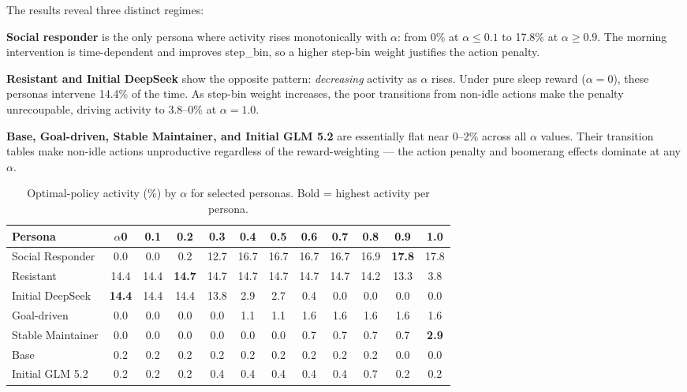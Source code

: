 \documentclass[11pt]{article}
\begin{document}
The results reveal three distinct regimes:

\textbf{Social responder} is the only persona where activity rises monotonically with $\alpha$: from 0\% at $\alpha \leq 0.1$ to 17.8\% at $\alpha \geq 0.9$. The morning intervention is time-dependent and improves step\_bin, so a higher step-bin weight justifies the action penalty.

\textbf{Resistant and Initial DeepSeek} show the opposite pattern: \emph{decreasing} activity as $\alpha$ rises. Under pure sleep reward ($\alpha = 0$), these personas intervene 14.4\% of the time. As step-bin weight increases, the poor transitions from non-idle actions make the penalty unrecoupable, driving activity to 3.8--0\% at $\alpha = 1.0$.

\textbf{Base, Goal-driven, Stable Maintainer, and Initial GLM 5.2} are essentially flat near 0--2\% across all $\alpha$ values. Their transition tables make non-idle actions unproductive regardless of the reward-weighting — the action penalty and boomerang effects dominate at any $\alpha$.

\begin{table}[H]
  \centering
  \caption{Optimal-policy activity (\%) by $\alpha$ for selected personas. Bold = highest activity per persona.}
  \label{tab:alpha_grid}
  \begin{tabular}{l|ccccccccccc}
    \toprule
    Persona & $\alpha$0 & 0.1 & 0.2 & 0.3 & 0.4 & 0.5 & 0.6 & 0.7 & 0.8 & \textbf{0.9} & 1.0 \\
    \midrule
    Social Responder  & 0.0 & 0.0 & 0.2 & 12.7 & 16.7 & 16.7 & 16.7 & 16.7 & 16.9 & \textbf{17.8} & 17.8 \\
    Resistant         & 14.4 & 14.4 & \textbf{14.7} & 14.7 & 14.7 & 14.7 & 14.7 & 14.7 & 14.2 & 13.3 & 3.8 \\
    Initial DeepSeek  & \textbf{14.4} & 14.4 & 14.4 & 13.8 & 2.9 & 2.7 & 0.4 & 0.0 & 0.0 & 0.0 & 0.0 \\
    Goal-driven       & 0.0 & 0.0 & 0.0 & 0.0 & 1.1 & 1.1 & 1.6 & 1.6 & 1.6 & 1.6 & 1.6 \\
    Stable Maintainer & 0.0 & 0.0 & 0.0 & 0.0 & 0.0 & 0.0 & 0.7 & 0.7 & 0.7 & 0.7 & \textbf{2.9} \\
    Base              & 0.2 & 0.2 & 0.2 & 0.2 & 0.2 & 0.2 & 0.2 & 0.2 & 0.2 & 0.0 & 0.0 \\
    Initial GLM 5.2   & 0.2 & 0.2 & 0.2 & 0.4 & 0.4 & 0.4 & 0.4 & 0.4 & 0.7 & 0.2 & 0.2 \\
    \bottomrule
  \end{tabular}
\end{table}
\end{document}
